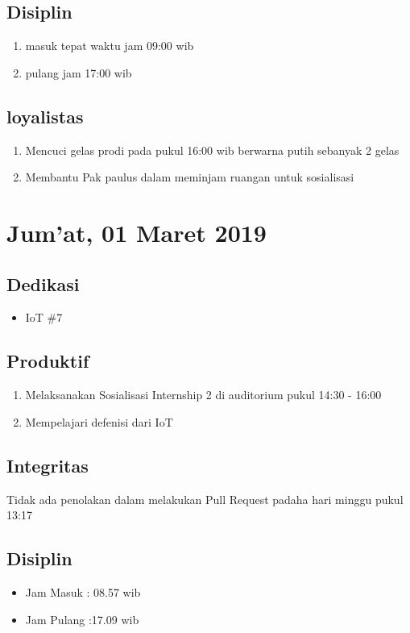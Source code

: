 \subsection{Disiplin}
\begin{enumerate}
  \item masuk tepat waktu jam 09:00 wib
  \item pulang jam 17:00 wib
\end{enumerate}
\subsection{loyalistas}
\begin{enumerate}
  \item Mencuci gelas prodi pada pukul 16:00 wib berwarna putih sebanyak 2 gelas
  \item Membantu Pak paulus dalam meminjam ruangan untuk sosialisasi
\end{enumerate} 

\section{Jum'at, 01 Maret 2019}
\subsection{Dedikasi}
\begin{itemize}
\item IoT \#7
\end{itemize}
\subsection{Produktif}
\begin{enumerate}
\item Melaksanakan Sosialisasi Internship 2 di auditorium pukul 14:30 - 16:00 
\item Mempelajari defenisi dari IoT
\end{enumerate}
\subsection{Integritas}
Tidak ada penolakan dalam melakukan Pull Request padaha hari minggu pukul 13:17
\subsection{Disiplin}
\begin{itemize}
\item Jam Masuk : 08.57 wib
\item Jam Pulang :17.09 wib
\end{itemize}
